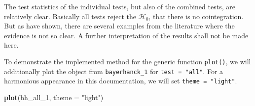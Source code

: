 \documentclass[11pt,a4paper]{article}
\newenvironment{Shaded}{\begin{snugshade}}{\end{snugshade}}
\newcommand{\CommentTok}[1]{\textcolor[rgb]{0.56,0.35,0.01}{\textit{#1}}}
\newcommand{\ControlFlowTok}[1]{\textcolor[rgb]{0.13,0.29,0.53}{\textbf{#1}}}
\newcommand{\DataTypeTok}[1]{\textcolor[rgb]{0.13,0.29,0.53}{#1}}
\newcommand{\DecValTok}[1]{\textcolor[rgb]{0.00,0.00,0.81}{#1}}
\newcommand{\FloatTok}[1]{\textcolor[rgb]{0.00,0.00,0.81}{#1}}
\newcommand{\KeywordTok}[1]{\textcolor[rgb]{0.13,0.29,0.53}{\textbf{#1}}}
\newcommand{\NormalTok}[1]{#1}
\newcommand{\OperatorTok}[1]{\textcolor[rgb]{0.81,0.36,0.00}{\textbf{#1}}}
\newcommand{\StringTok}[1]{\textcolor[rgb]{0.31,0.60,0.02}{#1}}
\begin{document}
\begin{Shaded}
\end{Shaded}

The test statistics of the individual tests, but also of the combined
tests, are relatively clear. Basically all tests reject the
\(\mathcal{H}_0\), that there is no cointegration. But as
\textcite{Bayerhanck2009} have shown, there are several examples from
the literature where the evidence is not so clear. A further
interpretation of the results shall not be made here.

To demonstrate the implemented method for the generic function
\texttt{plot()}, we will additionally plot the object from
\texttt{bayerhanck\_1} for \texttt{test\ =\ "all"}. For a harmonious
appearance in this documentation, we will set
\texttt{theme\ =\ "light"}.

\begin{Shaded}
\begin{Highlighting}[]
\KeywordTok{plot}\NormalTok{(bh_all_}\DecValTok{1}\NormalTok{, }\DataTypeTok{theme =} \StringTok{"light"}\NormalTok{)}
\end{Highlighting}
\end{Shaded}
\end{document}
